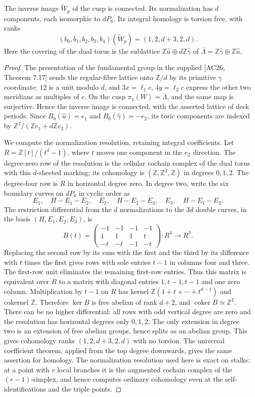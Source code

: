 

The inverse image $\widetilde W_p$ of the cusp is connected. Its
normalization has $d$ components, each isomorphic to $dP_6$. Its
integral homology is torsion free, with ranks
\[
 (b_0,b_1,b_2,b_3,b_4)(\widetilde W_p)=(1,2,d+3,2,d).
\]
Here the covering of the dual torus is the sublattice
$\mathbb Z\widehat u\oplus d\mathbb Z\widehat\gamma$ of
$\overline\Lambda=\mathbb Z\widehat\gamma\oplus\mathbb Z\widehat u$.
\begin{proof}
The presentation of the fundamental group in the supplied
\textup{[AC26, Theorem 7.17]} sends the regular-fibre lattice onto
$\mathbb Z/d$ by its primitive $\gamma$ coordinate: $12$ is a unit
modulo $d$, and $3x=\ell_1c$, $4y=\ell_2c$ express the other two
meridians as multiples of $c$. On the cusp $\pi_1(W)=\overline\Lambda$,
and the same map is surjective. Hence the inverse image is connected,
with the asserted lattice of deck periods. Since
$B_0(\widehat u)=e_1$ and $B_0(\widehat\gamma)=-e_2$, its toric
components are indexed by $\mathbb Z^2/(\mathbb Ze_1+d\mathbb Ze_2)$.

We compute the normalization resolution, retaining integral coefficients.
Let $R=\mathbb Z[t]/(t^d-1)$, where $t$ moves one component in the
$e_2$ direction. The degree-zero row of the resolution is the cellular
cochain complex of the dual torus with this $d$-sheeted marking; its
cohomology is $(\mathbb Z,\mathbb Z^2,\mathbb Z)$ in degrees $0,1,2$.
The degree-four row is $R$ in horizontal degree zero. In degree two,
write the six boundary curves on $dP_6$ in cyclic order as
\[
 E_1,\quad H-E_1-E_2,\quad E_2,\quad H-E_2-E_3,
 \quad E_3,\quad H-E_1-E_3.
\]
The restriction differential from the $d$ normalizations to the $3d$
double curves, in the basis $(H,E_1,E_2,E_3)$, is
\[
 B(t)=
 \begin{pmatrix}
 -1&-1&-1&-1\\
 1&1&1&t\\
 -t&-t&-1&-t
 \end{pmatrix}:R^4\longrightarrow R^3.
\]
Replacing the second row by its sum with the first and the third by
its difference with $t$ times the first gives rows with sole entries
$t-1$ in columns four and three. The first-row unit eliminates the
remaining first-row entries. Thus this matrix is equivalent over $R$
to a matrix with diagonal entries $1,t-1,t-1$ and one zero column.
Multiplication by $t-1$ on $R$ has kernel $\mathbb Z(1+t+\cdots+t^{d-1})$
and cokernel $\mathbb Z$. Therefore $\ker B$ is free abelian of rank
$d+2$, and $\operatorname{coker}B\simeq\mathbb Z^2$.
There can be no higher differential: all rows with odd vertical degree
are zero and the resolution has horizontal degrees only $0,1,2$.
The only extension in degree two is an extension of free abelian
groups, hence splits as an abelian group. This gives cohomology ranks
$(1,2,d+3,2,d)$ with no torsion. The universal coefficient theorem,
applied from the top degree downwards, gives the same assertion for
homology. The normalization resolution used here is exact on stalks:
at a point with $r$ local branches it is the augmented cochain complex
of the $(r-1)$-simplex, and hence computes ordinary cohomology even at
the self-identifications and the triple points.
\end{proof}


